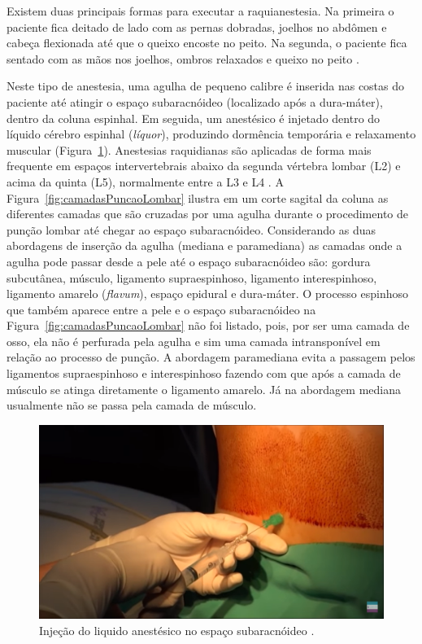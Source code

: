 Existem duas principais formas para executar a raquianestesia. Na primeira o paciente fica deitado de lado com as pernas dobradas, joelhos no abdômen e cabeça flexionada até que o queixo encoste no peito. Na segunda, o paciente fica sentado com as mãos nos joelhos, ombros relaxados e queixo no peito \cite{Anesclin2019}.

Neste tipo de anestesia, uma agulha de pequeno calibre é inserida nas costas do paciente até atingir o espaço subaracnóideo (localizado após a dura-máter), dentro da coluna espinhal. Em seguida, um anestésico é injetado dentro do líquido cérebro espinhal (\textit{líquor}), produzindo dormência temporária e relaxamento muscular (Figura~\ref{fig:injecaoAnestesico}). Anestesias raquidianas são aplicadas de forma mais frequente em espaços intervertebrais abaixo da segunda vértebra lombar (L2) e acima da quinta (L5), normalmente entre a L3 e L4 \cite{Wikipedia2019, Londero2018}. A Figura~\ref{fig:camadasPuncaoLombar} ilustra em um corte sagital da coluna as diferentes camadas que são cruzadas por uma agulha durante o procedimento de punção lombar até chegar ao espaço subaracnóideo. Considerando as duas abordagens de inserção da agulha (mediana e paramediana) as camadas onde a agulha pode passar desde a pele até o espaço subaracnóideo são: gordura subcutânea, músculo, ligamento supraespinhoso, ligamento interespinhoso, ligamento amarelo (\textit{flavum}), espaço epidural e dura-máter. O processo espinhoso que também aparece entre a pele e o espaço subaracnóideo na Figura~\ref{fig:camadasPuncaoLombar} não foi listado, pois, por ser uma camada de osso, ela não é perfurada pela agulha e sim uma camada intransponível em relação ao processo de punção. A abordagem paramediana evita a passagem pelos ligamentos supraespinhoso e interespinhoso fazendo com que após a camada de músculo se atinga diretamente o ligamento amarelo. Já na abordagem mediana usualmente não se passa pela camada de músculo.

\begin{figure}[ht!]
    \centering
    \includegraphics[width=0.6\linewidth]{capitulos/figuras/4.InjecaoAnestesico.png}
    \caption{Injeção do liquido anestésico no espaço subaracnóideo  \cite{Londero2018}.}
    \label{fig:injecaoAnestesico}
\end{figure}

